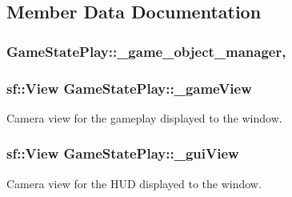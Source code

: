 \subsection{Member Data Documentation}
\hypertarget{class_game_state_play_a3f05ff560a8dbeb5a1922e23c6bbff72}{
\subsubsection[{\+\_\+game\+\_\+object\+\_\+manager}]{ Game\+State\+Play\+::\+\_\+game\+\_\+object\+\_\+manager\hspace{0.3cm}{\ttfamily [static]}, {\ttfamily [private]}}}\label{class_game_state_play_a3f05ff560a8dbeb5a1922e23c6bbff72}
\hypertarget{class_game_state_play_a9513cfeac2178d83e23ba6f9291fba8c}{
\subsubsection[{\+\_\+game\+View}]{\setlength{\rightskip}{0pt plus 5cm}sf\+::\+View Game\+State\+Play\+::\+\_\+game\+View\hspace{0.3cm}{\ttfamily [private]}}}\label{class_game_state_play_a9513cfeac2178d83e23ba6f9291fba8c}


Camera view for the gameplay displayed to the window. 

\hypertarget{class_game_state_play_affee804e287fd1968fe8c5b0a303b05d}{
\subsubsection[{\+\_\+gui\+View}]{\setlength{\rightskip}{0pt plus 5cm}sf\+::\+View Game\+State\+Play\+::\+\_\+gui\+View\hspace{0.3cm}{\ttfamily [private]}}}\label{class_game_state_play_affee804e287fd1968fe8c5b0a303b05d}


Camera view for the H\+U\+D displayed to the window. 

